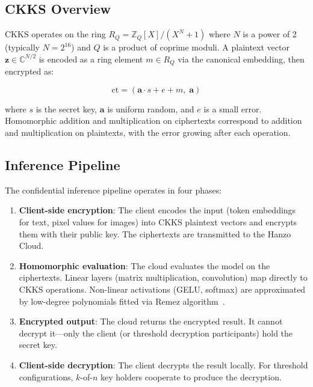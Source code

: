 \documentclass[11pt]{article}
\begin{document}
\subsection{CKKS Overview}

CKKS operates on the ring $R_Q = \mathbb{Z}_Q[X]/(X^N + 1)$ where $N$ is a
power of 2 (typically $N = 2^{16}$) and $Q$ is a product of coprime moduli.
A plaintext vector $\bm{z} \in \mathbb{C}^{N/2}$ is encoded as a ring
element $m \in R_Q$ via the canonical embedding, then encrypted as:

\begin{equation}
\text{ct} = (\bm{a} \cdot s + e + m, \; \bm{a})
\end{equation}

where $s$ is the secret key, $\bm{a}$ is uniform random, and $e$ is a small
error. Homomorphic addition and multiplication on ciphertexts correspond to
addition and multiplication on plaintexts, with the error growing after each
operation.

\subsection{Inference Pipeline}

The confidential inference pipeline operates in four phases:

\begin{enumerate}[leftmargin=1.4em]
    \item \textbf{Client-side encryption}: The client encodes the input (token
    embeddings for text, pixel values for images) into CKKS plaintext vectors
    and encrypts them with their public key. The ciphertexts are transmitted
    to the Hanzo Cloud.
    \item \textbf{Homomorphic evaluation}: The cloud evaluates the model on
    the ciphertexts. Linear layers (matrix multiplication, convolution) map
    directly to CKKS operations. Non-linear activations (GELU, softmax) are
    approximated by low-degree polynomials fitted via Remez
    algorithm~\cite{hanzocandle, hanzofhe}.
    \item \textbf{Encrypted output}: The cloud returns the encrypted result.
    It cannot decrypt it---only the client (or threshold decryption
    participants) hold the secret key.
    \item \textbf{Client-side decryption}: The client decrypts the result
    locally. For threshold configurations, $k$-of-$n$ key holders cooperate
    to produce the decryption.
\end{enumerate}
\end{document}
